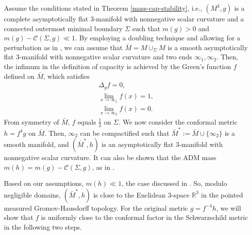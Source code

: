 \documentclass[letter]{amsart}
\theoremstyle{definition}
\theoremstyle{remark}
\begin{document}
Assume the conditions stated in Theorem \ref{mass-cap-stability}, i.e., $(M^3, g)$ is a complete asymptotically flat $3$-manifold with nonnegative scalar curvature and a connected outermost minimal boundary $\Sigma$ such that $m(g)>0$ and $m(g)-  \mathcal{C}(\Sigma, g) \ll 1$. By employing a doubling technique and allowing for a perturbation as in \cite{Bray'01}, we can assume that $\bar{M} = M \cup _\Sigma M$ is a smooth asymptotically flat $3$-manifold with nonnegative scalar curvature and two ends $\infty_1, \infty_2$.
Then, the infimum in the definition of capacity is achieved by the Green's function $f$ defined on $\bar{M}$, which satisfies
\begin{align*}
	\Delta _g f = 0,\\
	\lim_{x\to \infty_1} f(x) =1,\\ 
	\lim_{x\to \infty_2} f(x) =0.   
\end{align*}
From symmetry of $\bar{M}$, $f$ 
equals $\frac{1}{2}$ on $\Sigma$. We now consider the conformal metric $h= f^{4} g$ on $\bar{M}$. Then, $\infty_2$ can be compactified such that $\bar{M}^* := \bar{M} \cup \{\infty_2\} $ is a smooth manifold, and $(\bar{M}^*, h)$ is an asymptotically flat $3$-manifold with nonnegative scalar curvature. It can also be shown that the ADM mass $m(h) = m(g) -  \mathcal{C}(\Sigma,g)$, as in \cite{Bray'01}.

Based on our assumptions, $m(h) \ll 1$, the case discussed in \cite{DS'23}. So, modulo negligible domains, $(\bar{M}^*, h)$ is close to the Euclidean $3$-space $\mathbb{R}^3$ in the pointed measured Gromov-Hausdorff topology. For the original metric $g = f^{-4} h$, we will show that $f$ is uniformly close to the conformal factor in the Schwarzschild metric in the following two steps.
\end{document}
